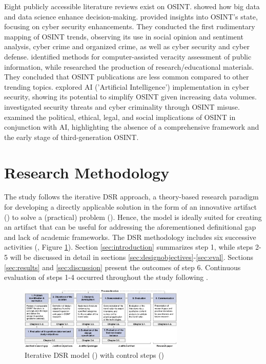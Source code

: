 \documentclass[10pt]{article}
\begin{document}
Eight publicly accessible literature reviews exist on OSINT. \textcite{DosPassos.2017} showed how big data and data science enhance decision-making. \textcite{PastorGalindo.2019, PastorGalindo.2020}
provided insights into OSINT's state, focusing on cyber security
enhancements. They conducted the first rudimentary mapping of OSINT trends, observing its use in social opinion and sentiment
analysis, cyber crime and organized crime, as well as cyber security and cyber defense. \textcite{GarciaLozano.2020} identified methods for computer-assisted veracity assessment of public information, while
\textcite{HerreraCubides.2020} researched the production of research/educational materials. They concluded that OSINT
publications are less common compared to other trending topics. \textcite{Yogish.2021} explored AI ('Artificial Intelligence') implementation in cyber security,
showing its potential to simplify OSINT given increasing data volumes.
\textcite{Hwang.2022} investigated security threats and cyber criminality through OSINT misuse.
\textcite{Ghioni.2023} examined the political, ethical, legal, and social implications of
OSINT in conjunction with AI, highlighting the absence of a comprehensive framework and the early stage of third-generation OSINT.

\section{Research Methodology}

The study follows the iterative DSR approach, a theory-based research paradigm for developing a directly applicable solution in the form of an innovative artifact (\cite{vomBrocke.2020b})
to solve a (practical) problem (\cite{Peffers.2007}). Hence, the model is ideally suited for creating an artifact that can be useful for addressing the aforementioned definitional gap and lack of academic frameworks. The DSR methodology includes
six successive activities (\cite{Peffers.2007}, Figure \ref{fig: DSRM}). Section \ref{sec:introduction} summarizes step 1, while steps 2-5 will be discussed in detail in sections \ref{sec:designobjectives}-\ref{sec:eval}. Sections \ref{sec:results} and \ref{sec:discussion} present the outcomes of step 6. Continuous evaluation of steps 1-4 occurred throughout the study following \textcite{Sonnenberg.2012}.

\begin{figure}[thb]
    \centering
    \includegraphics[width=0.7\textwidth]{PDF/images/cropped DSR_V01.pdf}
    \caption{Iterative DSR model (\cite{Peffers.2007}) with control steps (\cite{Sonnenberg.2012})}
    \label{fig: DSRM}
\end{figure}
\end{document}
